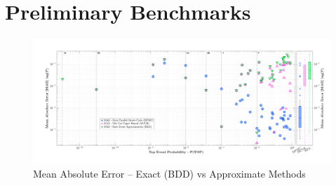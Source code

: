 \section{Preliminary Benchmarks}





\clearpage
\begin{landscape}
\begin{figure}[h]
    \centering
    \includegraphics[width=1.2\textwidth]{parts/2_bruteforce/3_benchmark/error_vs_prob_detailed.png}
    \caption{Mean Absolute Error – Exact (BDD) vs Approximate Methods}
    \label{fig:mae_vs_logp}
\end{figure}
\end{landscape}

